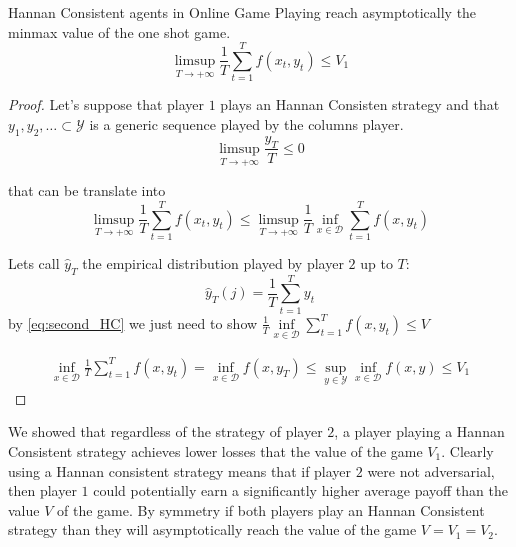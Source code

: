 \begin{theorem}
    Hannan Consistent agents in Online Game Playing reach asymptotically the minmax value of the one shot game.
    $$\limsup\limits_{T\to +\infty}\frac{1}{T}\sum\limits_{t=1}^Tf(x_t,y_t)\le V_1$$
\end{theorem}

\begin{proof}
    Let's suppose that player $1$ plays an Hannan Consisten strategy and that $y_1,y_2,\ldots \subset \mathcal Y$ is a generic sequence played by the columns player.
    \begin{equation}
        \limsup\limits_{T\to+\infty}\frac{y_T}{T}\le0
    \end{equation}
    
    that can be translate into 
    \begin{equation}\label{eq:second_HC}
        \limsup\limits_{T\to+\infty}\frac{1}{T}\sum\limits_{t=1}^Tf(x_t,y_t)\le\limsup\limits_{T\to+\infty}\frac{1}{T}\inf\limits_{x\in\mathcal D}\sum\limits_{t=1}^Tf(x,y_t)
    \end{equation}

    Lets call $\hat y_T$ the empirical distribution played by player $2$ up to $T$:
    $$\hat y_T(j)=\frac{1}{T}\sum\limits_{t=1}^Ty_t$$
    by \eqref{eq:second_HC} we just need to show $\frac{1}{T}\inf\limits_{x\in \mathcal D} \sum\limits_{t=1}^T f(x,y_t)\le V$

    \begin{align}
        \inf\limits_{x\in\mathcal D}\frac{1}{T}\sum\limits_{t=1}^T f(x,y_t)=\inf\limits_{x\in\mathcal D} f(x,y_T)\le\sup\limits_{y\in\mathcal Y}\inf\limits_{x\in\mathcal D} f(x,y)\le V_1
    \end{align}
\end{proof}

We showed that regardless of the strategy of player $2$, a player playing a Hannan Consistent strategy achieves lower losses that the value of the game $V_1$. Clearly using a Hannan consistent strategy means that if player $2$ were not adversarial, then player $1$ could potentially earn a significantly higher average payoff than the value $V$ of the game. By symmetry if both players play an Hannan Consistent strategy than they will asymptotically reach the value of the game $V=V_1=V_2$.

